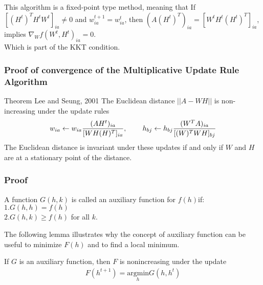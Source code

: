 \documentclass[aspectratio=169]{beamer}
\begin{document}
\begin{frame}
        This algorithm is a fixed-point type method, meaning that If $[(H^{t})^{T}H^{t}W^{t}]_{ia} \neq 0$ and
        $w_{ia}^{t+1} = w_{ia}^{t}$, then $(A(H^{t})^{T})_{ia} = [W^{t}H^{t}(H^{t})^{T}]_{ia}$, implies 
        $\nabla_{W}f(W^{t}, H^{t})_{ia} = 0$.\\
        Which is part of the KKT condition.
\end{frame}
\begin{frame}
    \frametitle{Proof of convergence of the Multiplicative Update Rule Algorithm}
    \begin{block}{Theorem Lee and Seung, 2001}
        The Euclidean distance $||A - WH||$ is non-increasing under the update rules
        \begin{align*}
            w_{ia} \gets w_{ia}\frac{(AH^{t})_{ia}}{[WH(H)^{T}]_{ia}}, \hspace{0.3in}
            h_{bj} \gets h_{bj}\frac{(W^{T}A)_{ia}}{[(W)^{T}WH]_{bj}} 
        \end{align*}
        The Euclidean distance is invariant under these updates if and only if $W$ and $H$ are at
        a stationary point of the distance.
    \end{block}
\end{frame}
\begin{frame}
    \frametitle{Proof}
    \begin{definition}
        A function $G(h, k)$ is called an auxiliary function for $f(h) $if:\\
        $1. G(h,h) = f(h)$\\
        $2. G(h,k) \geq f(h)$ for all $k$. 
    \end{definition}
    The following lemma illustrates why the concept of auxiliary function can be useful to
    minimize $F(h)$ and to find a local minimum.
    \begin{lemma}
        If $G$ is an auxiliary function, then $F$ is nonincreasing under the update\\
        \begin{align}
            F(h^{t+1}) = \underset{h}{\mathrm{argmin}}G(h, h^{t})
        \end{align}
    \end{lemma}
\end{frame}
\end{document}
